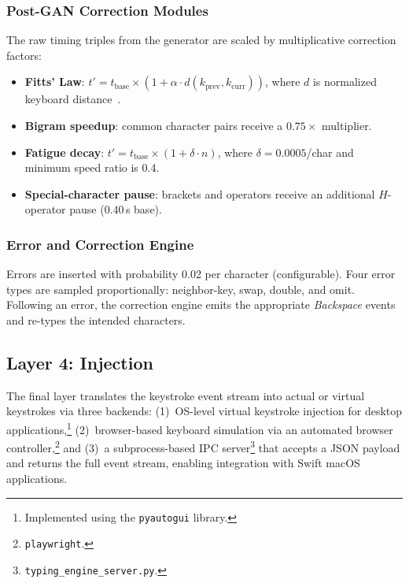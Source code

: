 \documentclass[sigconf,nonacm]{acmart}
\begin{document}
\subsubsection{Post-GAN Correction Modules}

The raw timing triples from the generator are scaled by multiplicative correction factors:
\begin{itemize}
  \item \textbf{Fitts' Law}:
    $t' = t_\text{base} \times (1 + \alpha \cdot d(k_{\text{prev}}, k_\text{curr}))$,
    where $d$ is normalized keyboard distance~\cite{fitts1954information}.
  \item \textbf{Bigram speedup}: common character pairs receive a $0.75\times$ multiplier.
  \item \textbf{Fatigue decay}: $t' = t_\text{base} \times (1 + \delta \cdot n)$,
    where $\delta = 0.0005$/char and minimum speed ratio is 0.4.
  \item \textbf{Special-character pause}: brackets and operators receive an additional
    $H$-operator pause (0.40\,s base).
\end{itemize}

\subsubsection{Error and Correction Engine}

Errors are inserted with probability 0.02 per character (configurable). Four error types
are sampled proportionally: neighbor-key, swap, double, and omit.
Following an error, the correction engine emits the appropriate \textit{Backspace}
events and re-types the intended characters.

\subsection{Layer 4: Injection}

The final layer translates the keystroke event stream into actual or virtual keystrokes
via three backends: (1)~OS-level virtual keystroke injection for desktop
applications,\footnote{Implemented using the \texttt{pyautogui} library.}
(2)~browser-based keyboard simulation via an automated browser controller,\footnote{\texttt{playwright}.}
and (3)~a subprocess-based IPC server\footnote{\texttt{typing\_engine\_server.py}.}
that accepts a JSON payload and returns the full event stream, enabling integration
with Swift macOS applications.


\end{document}
